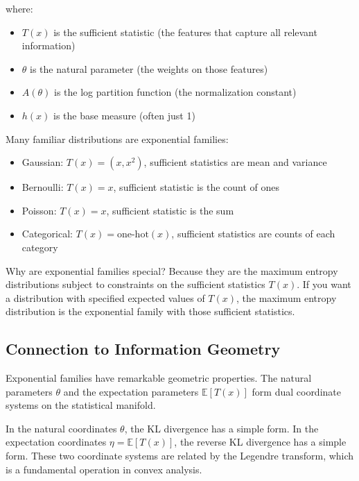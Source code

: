 where:
\begin{itemize}
\item $T(x)$ is the sufficient statistic (the features that capture all relevant information)
\item $\theta$ is the natural parameter (the weights on those features)
\item $A(\theta)$ is the log partition function (the normalization constant)
\item $h(x)$ is the base measure (often just 1)
\end{itemize}

\vspace{1em}

Many familiar distributions are exponential families:

\begin{itemize}
\item Gaussian: $T(x) = (x, x^2)$, sufficient statistics are mean and variance

\item Bernoulli: $T(x) = x$, sufficient statistic is the count of ones

\item Poisson: $T(x) = x$, sufficient statistic is the sum

\item Categorical: $T(x) = \text{one-hot}(x)$, sufficient statistics are counts of each category
\end{itemize}

\vspace{1em}

Why are exponential families special? Because they are the maximum entropy distributions subject to constraints on the sufficient statistics $T(x)$. If you want a distribution with specified expected values of $T(x)$, the maximum entropy distribution is the exponential family with those sufficient statistics.

\vspace{1.5em}

\subsection{Connection to Information Geometry}

Exponential families have remarkable geometric properties. The natural parameters $\theta$ and the expectation parameters $\mathbb{E}[T(x)]$ form dual coordinate systems on the statistical manifold.

In the natural coordinates $\theta$, the KL divergence has a simple form. In the expectation coordinates $\eta = \mathbb{E}[T(x)]$, the reverse KL divergence has a simple form. These two coordinate systems are related by the Legendre transform, which is a fundamental operation in convex analysis.

